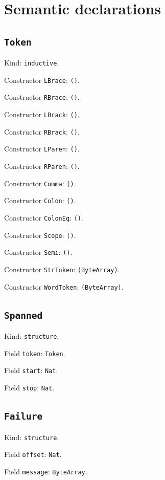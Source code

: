 \documentclass[11pt]{article}
\begin{document}
\section*{Semantic declarations}
\subsection*{\texttt{Token}}
\noindent Kind: \texttt{inductive}.\par
\noindent Constructor \texttt{LBrace}: \texttt{()}.\par
\noindent Constructor \texttt{RBrace}: \texttt{()}.\par
\noindent Constructor \texttt{LBrack}: \texttt{()}.\par
\noindent Constructor \texttt{RBrack}: \texttt{()}.\par
\noindent Constructor \texttt{LParen}: \texttt{()}.\par
\noindent Constructor \texttt{RParen}: \texttt{()}.\par
\noindent Constructor \texttt{Comma}: \texttt{()}.\par
\noindent Constructor \texttt{Colon}: \texttt{()}.\par
\noindent Constructor \texttt{ColonEq}: \texttt{()}.\par
\noindent Constructor \texttt{Scope}: \texttt{()}.\par
\noindent Constructor \texttt{Semi}: \texttt{()}.\par
\noindent Constructor \texttt{StrToken}: \texttt{(ByteArray)}.\par
\noindent Constructor \texttt{WordToken}: \texttt{(ByteArray)}.\par
\subsection*{\texttt{Spanned}}
\noindent Kind: \texttt{structure}.\par
\noindent Field \texttt{token}: \texttt{Token}.\par
\noindent Field \texttt{start}: \texttt{Nat}.\par
\noindent Field \texttt{stop}: \texttt{Nat}.\par
\subsection*{\texttt{Failure}}
\noindent Kind: \texttt{structure}.\par
\noindent Field \texttt{offset}: \texttt{Nat}.\par
\noindent Field \texttt{message}: \texttt{ByteArray}.\par
\end{document}
